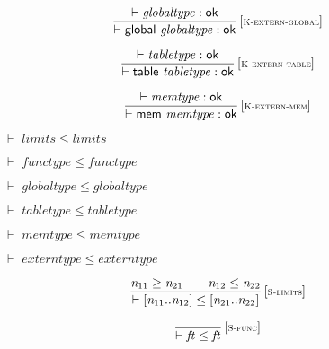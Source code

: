 $$
\begin{array}{@{}c@{}}\displaystyle
\frac{
{ \vdash }\;{\mathit{globaltype}} : \mathsf{ok}
}{
{ \vdash }\;\mathsf{global}~{\mathit{globaltype}} : \mathsf{ok}
} \, {[\textsc{\scriptsize K{-}extern{-}global}]}
\qquad
\end{array}
$$

$$
\begin{array}{@{}c@{}}\displaystyle
\frac{
{ \vdash }\;{\mathit{tabletype}} : \mathsf{ok}
}{
{ \vdash }\;\mathsf{table}~{\mathit{tabletype}} : \mathsf{ok}
} \, {[\textsc{\scriptsize K{-}extern{-}table}]}
\qquad
\end{array}
$$

$$
\begin{array}{@{}c@{}}\displaystyle
\frac{
{ \vdash }\;{\mathit{memtype}} : \mathsf{ok}
}{
{ \vdash }\;\mathsf{mem}~{\mathit{memtype}} : \mathsf{ok}
} \, {[\textsc{\scriptsize K{-}extern{-}mem}]}
\qquad
\end{array}
$$

\vspace{1ex}

\vspace{1ex}

$\boxed{{ \vdash }\;{\mathit{limits}} \leq {\mathit{limits}}}$

$\boxed{{ \vdash }\;{\mathit{functype}} \leq {\mathit{functype}}}$

$\boxed{{ \vdash }\;{\mathit{globaltype}} \leq {\mathit{globaltype}}}$

$\boxed{{ \vdash }\;{\mathit{tabletype}} \leq {\mathit{tabletype}}}$

$\boxed{{ \vdash }\;{\mathit{memtype}} \leq {\mathit{memtype}}}$

$\boxed{{ \vdash }\;{\mathit{externtype}} \leq {\mathit{externtype}}}$

\vspace{1ex}

$$
\begin{array}{@{}c@{}}\displaystyle
\frac{
{\mathit{n}}_{{11}} \geq {\mathit{n}}_{{21}}
 \qquad
{\mathit{n}}_{{12}} \leq {\mathit{n}}_{{22}}
}{
{ \vdash }\;[{\mathit{n}}_{{11}} .. {\mathit{n}}_{{12}}] \leq [{\mathit{n}}_{{21}} .. {\mathit{n}}_{{22}}]
} \, {[\textsc{\scriptsize S{-}limits}]}
\qquad
\end{array}
$$

$$
\begin{array}{@{}c@{}}\displaystyle
\frac{
}{
{ \vdash }\;{\mathit{ft}} \leq {\mathit{ft}}
} \, {[\textsc{\scriptsize S{-}func}]}
\qquad
\end{array}
$$

